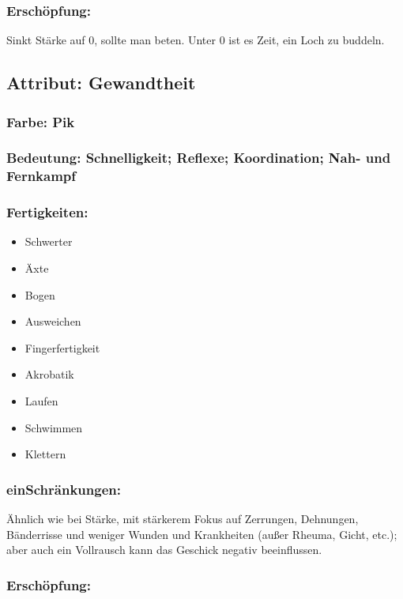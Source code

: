 \subsubsection{Erschöpfung:}

Sinkt Stärke auf 0, sollte man beten. Unter 0 ist es Zeit, ein Loch zu buddeln.

\subsection{Attribut: Gewandtheit}

\subsubsection{Farbe: Pik}

\subsubsection{Bedeutung: Schnelligkeit; Reflexe; Koordination; Nah- und Fernkampf}

\subsubsection{Fertigkeiten:}
\begin{itemize}
\item Schwerter
\item Äxte
\item Bogen
\item Ausweichen
\item Fingerfertigkeit
\item Akrobatik
\item Laufen
\item Schwimmen
\item Klettern
\end{itemize}

\subsubsection{einSchränkungen:}

Ähnlich wie bei Stärke, mit stärkerem Fokus auf Zerrungen, Dehnungen, Bänderrisse und weniger Wunden und Krankheiten (außer Rheuma, Gicht, etc.); aber auch ein Vollrausch kann das Geschick negativ beeinflussen.

\subsubsection{Erschöpfung:}

